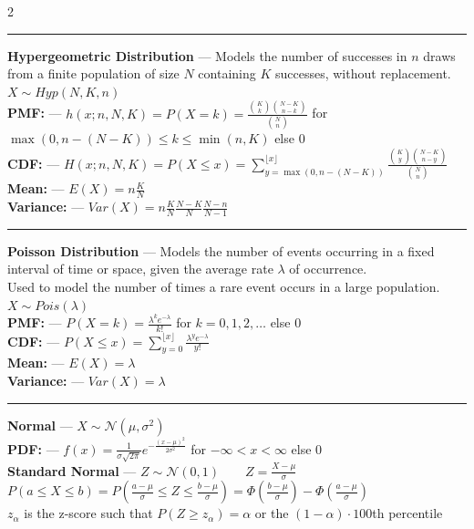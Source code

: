 \documentclass[10pt,letterpaper]{article}
\begin{document}
\begin{multicols}{2}
\vspace{0.1cm}
\hrule
\vspace{0.1cm}

\textbf{Hypergeometric Distribution} --- Models the number of successes in \( n \) draws from a finite population of size \( N \) containing \( K \) successes,
without replacement.\\
$X \sim Hyp(N, K, n)$\\
\textbf{PMF:} --- $h(x; n, N, K) = P(X = k) = \frac{\binom{K}{k} \binom{N-K}{n-k}}{\binom{N}{n}}$ for $ \max(0, n-(N-K)) \leq k \leq \min(n, K) $ else $0$\\
\textbf{CDF:} --- $H(x; n, N, K) = P(X \leq x) = \sum_{y=\max(0, n-(N-K))}^{\lfloor x \rfloor} \frac{\binom{K}{y} \binom{N-K}{n-y}}{\binom{N}{n}}$\\
\textbf{Mean:} --- $E(X) = n \frac{K}{N}$\\
\textbf{Variance:} --- $Var(X) = n \frac{K}{N} \frac{N-K}{N} \frac{N-n}{N-1}$

\vspace{0.1cm}
\hrule
\vspace{0.1cm}

\textbf{Poisson Distribution} --- Models the number of events occurring in a fixed interval of time or space, given the average rate \( \lambda \) of occurrence.\\
Used to model the number of times a rare event occurs in a large population.\\
$X \sim Pois(\lambda)$\\
\textbf{PMF:} --- $P(X = k) = \frac{\lambda^k e^{-\lambda}}{k!}$ for $ k = 0, 1, 2, \ldots $ else $0$\\
\textbf{CDF:} --- $P(X \leq x) = \sum_{y=0}^{\lfloor x \rfloor} \frac{\lambda^y e^{-\lambda}}{y!}$\\
\textbf{Mean:} --- $E(X) = \lambda$\\
\textbf{Variance:} --- $Var(X) = \lambda$ 

\vspace{0.1cm}
\hrule
\vspace{0.1cm}

\textbf{Normal} --- $X \sim \mathcal{N}(\mu, \sigma^2)$\\
\textbf{PDF:} --- $f(x) = \frac{1}{\sigma \sqrt{2 \pi}} e^{-\frac{(x - \mu)^2}{2\sigma^2}}$ for $ -\infty < x < \infty $ else $0$\\
\textbf{Standard Normal} --- $Z \sim \mathcal{N}(0, 1) \qquad Z = \frac{X - \mu}{\sigma}$\\
$P(a \leq X \leq b) = P(\frac{a - \mu}{\sigma} \leq Z \leq \frac{b - \mu}{\sigma}) = \Phi(\frac{b - \mu}{\sigma}) - \Phi(\frac{a - \mu}{\sigma})$\\
$z_\alpha$ is the z-score such that $P(Z \geq z_\alpha) = \alpha$ or the $(1 - \alpha) \cdot 100$th percentile


\end{multicols}
\end{document}
